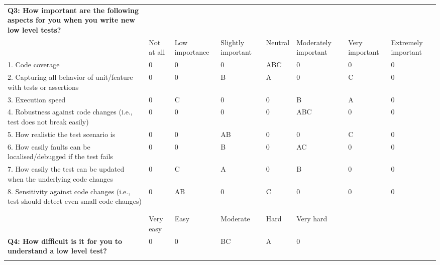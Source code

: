 \begin{table}
{\begin{tabular}{p{20.0cm}*{7}{p{2.0cm}}}
            \textbf{Q3: How important are the following aspects for you when you write new low level tests?} & & & & & & \\
            & Not at all & Low \newline importance & Slightly important & Neutral & Moderately important & Very \newline important & Extremely important \\
            1. Code coverage & 0 & 0 & 0 & ABC & 0 & 0 & 0 \\
            2. Capturing all behavior of unit/feature with tests or assertions & 0 & 0 & B & A & 0 & C & 0 \\
            3. Execution speed & 0 & C & 0 & 0 & B & A & 0 \\
            4. Robustness against code changes (i.e., test does not break easily) & 0 & 0 & 0 & 0 & ABC & 0 & 0 \\
            5. How realistic the test scenario is & 0 & 0 & AB & 0 & 0 & C & 0 \\
            6. How easily faults can be localised/debugged if the test fails & 0 & 0 & B & 0 & AC & 0 & 0 \\
            7. How easily the test can be updated when the underlying code changes & 0 & C & A & 0 & B & 0 & 0 \\
            8. Sensitivity against code changes (i.e., test should detect even small code changes) & 0 & AB & 0 & C & 0 & 0 & 0 \\
            & \\ \hline

            & & & & & & \\
            & Very easy & Easy & Moderate & Hard & Very hard & & \\
            \textbf{Q4: How difficult is it for you to understand a low level test?} & 0 & 0 & BC & A & 0 \\
            & \\ \hline


\end{tabular}}
\end{table}
